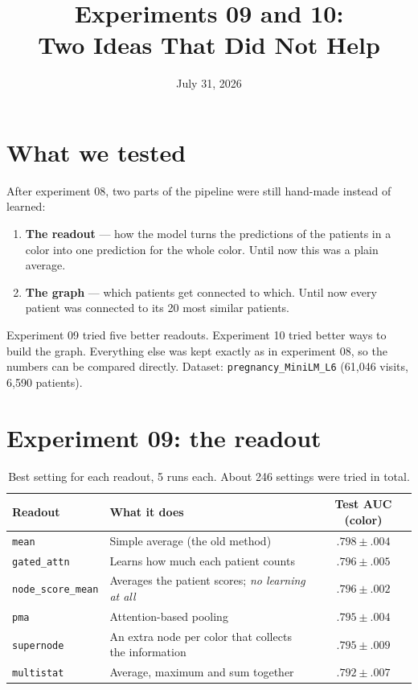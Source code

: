 \documentclass[11pt]{article}
\title{Experiments 09 and 10:\\ Two Ideas That Did Not Help}
\author{}
\date{July 31, 2026}
\begin{document}
\maketitle

\section*{What we tested}

After experiment 08, two parts of the pipeline were still hand-made instead of learned:

\begin{enumerate}
  \item \textbf{The readout} --- how the model turns the predictions of the patients in a color
        into one prediction for the whole color. Until now this was a plain average.
  \item \textbf{The graph} --- which patients get connected to which. Until now every patient was
        connected to its 20 most similar patients.
\end{enumerate}

Experiment 09 tried five better readouts. Experiment 10 tried better ways to build the graph.
Everything else was kept exactly as in experiment 08, so the numbers can be compared directly.
Dataset: \texttt{pregnancy\_MiniLM\_L6} (61{,}046 visits, 6{,}590 patients).

\section*{Experiment 09: the readout}

\begin{table}[h]
\centering
\begin{tabularx}{\textwidth}{lXc}
\toprule
Readout & What it does & Test AUC (color) \\
\midrule
\texttt{mean} & Simple average (the old method) & $\mathbf{.798 \pm .004}$ \\
\texttt{gated\_attn} & Learns how much each patient counts & $.796 \pm .005$ \\
\texttt{node\_score\_mean} & Averages the patient scores; \emph{no learning at all} & $.796 \pm .002$ \\
\texttt{pma} & Attention-based pooling & $.795 \pm .004$ \\
\texttt{supernode} & An extra node per color that collects the information & $.795 \pm .009$ \\
\texttt{multistat} & Average, maximum and sum together & $.792 \pm .007$ \\
\bottomrule
\end{tabularx}
\caption{Best setting for each readout, 5 runs each. About 246 settings were tried in total.}
\end{table}
\end{document}
